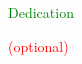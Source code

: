 \vspace*{7cm}
\begin{center}
\textcolor{green}{Dedication}

\textcolor{red}{(optional)}

\end{center}

\cleardoublepage